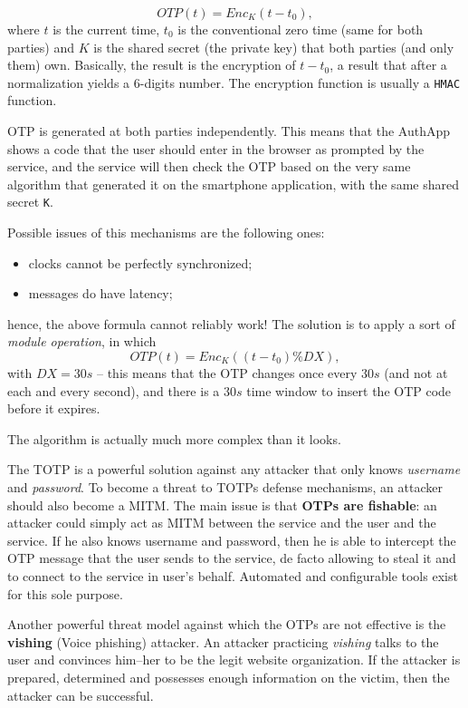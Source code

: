 \documentclass[10pt]{extbook}
\begin{document}
$$ OTP(t) = Enc_K(t - t_0), $$ where $t$ is the current time, $t_0$ is the
conventional zero time (same for both parties) and $K$ is the shared secret
(the private key) that both parties (and only them) own. Basically, the result
is the encryption of $t - t_0$, a result that after a normalization yields a
$6$-digits number. The encryption function is usually a \texttt{HMAC} function.

OTP is generated at both parties independently. This means that the AuthApp
shows a code that the user should enter in the browser as prompted by the
service, and the service will then check the OTP based on the very same
algorithm that generated it on the smartphone application, with the same shared
secret \texttt{K}.

Possible issues of this mechanisms are the following ones:
\begin{itemize}
    \item clocks cannot be perfectly synchronized;
    \item messages do have latency;
\end{itemize}

hence, the above formula cannot reliably work! The solution is to apply a sort
of \emph{module operation}, in which 
$$ OTP(t) = Enc_K((t - t_0) \% DX), $$  with $DX = 30s$ -- this means that the OTP
changes once every $30s$ (and not at each and every second), and there is a
$30s$ time window to insert the OTP code before it expires.

The algorithm is actually much more complex than it looks.

The TOTP is a powerful solution against any attacker that only knows
\emph{username} and \emph{password}. To become a threat to TOTPs defense
mechanisms, an attacker should also become a MITM. The main issue is that
\textbf{OTPs are fishable}: an attacker could simply act as MITM between the
service and the user and the service. If he also knows username and password,
then he is able to intercept the OTP message that the user sends to the
service, de facto allowing to steal it and to connect to the service in user's
behalf. Automated and configurable tools exist for this sole purpose.

Another powerful threat model against which the OTPs are not effective is the
\textbf{vishing} (Voice phishing) attacker. An attacker practicing
\emph{vishing} talks to the user and convinces him\---her to be the legit
website organization. If the attacker is prepared, determined and possesses
enough information on the victim, then the attacker can be successful.
\end{document}
